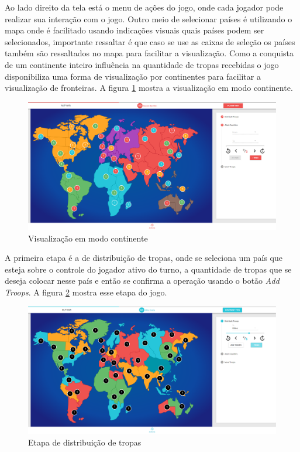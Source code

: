 \documentclass[rel_mlp]{iiufrgs}
\begin{document}
Ao lado direito da tela está o menu de ações do jogo, onde cada jogador pode realizar sua interação com o jogo. Outro meio de selecionar países é utilizando o mapa onde é facilitado usando indicações visuais quais países podem ser selecionados, importante ressaltar é que caso se use as caixas de seleção os países também são ressaltados no mapa para facilitar a visualização.
Como a conquista de um continente inteiro influência na quantidade de tropas recebidas o jogo disponibiliza uma forma de visualização por continentes para facilitar a visualização de fronteiras. 
A figura \ref{fig:continentView} mostra a visualização em modo continente.

\begin{figure}[h!]
\centering
  \includegraphics[width=1.0\textwidth]{images/continentView.png}
  \caption{Visualização em modo continente}
  \label{fig:continentView}
\end{figure}

A primeira etapa é a de distribuição de tropas, onde se seleciona um país que esteja sobre o controle do jogador ativo do turno, a quantidade de tropas que se deseja colocar nesse país e então se confirma a operação usando o botão \textit{Add Troops}.
A figura \ref{fig:distribution} mostra esse etapa do jogo.

\begin{figure}[h!]
\centering
  \includegraphics[width=1.0\textwidth]{images/distribution.png}
  \caption{Etapa de distribuição de tropas}
  \label{fig:distribution}
\end{figure}
\end{document}
